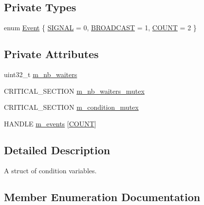 \subsection*{Private Types}
\begin{DoxyCompactItemize}
\item 
enum \hyperlink{structmage_1_1_condition_variable_ae7627253bf4faebc0aae84a77920d195}{Event} \{ \hyperlink{structmage_1_1_condition_variable_ae7627253bf4faebc0aae84a77920d195a83361ddf52d1973875f7a48ac4bccf94}{S\+I\+G\+N\+AL} = 0, 
\hyperlink{structmage_1_1_condition_variable_ae7627253bf4faebc0aae84a77920d195a5863233d3c1e62ca806753b0d175199f}{B\+R\+O\+A\+D\+C\+A\+ST} = 1, 
\hyperlink{structmage_1_1_condition_variable_ae7627253bf4faebc0aae84a77920d195a553680ab09f088489b7d9f3cef9a5e14}{C\+O\+U\+NT} = 2
 \}
\end{DoxyCompactItemize}
\subsection*{Private Attributes}
\begin{DoxyCompactItemize}
\item 
uint32\+\_\+t \hyperlink{structmage_1_1_condition_variable_ac02cb14000a597ec91b8546bdcbb9dd1}{m\+\_\+nb\+\_\+waiters}
\item 
C\+R\+I\+T\+I\+C\+A\+L\+\_\+\+S\+E\+C\+T\+I\+ON \hyperlink{structmage_1_1_condition_variable_a0686e682d62d44ff1eb9ac45acbb0eab}{m\+\_\+nb\+\_\+waiters\+\_\+mutex}
\item 
C\+R\+I\+T\+I\+C\+A\+L\+\_\+\+S\+E\+C\+T\+I\+ON \hyperlink{structmage_1_1_condition_variable_ab5ff870b2881a1979ccaec986d762441}{m\+\_\+condition\+\_\+mutex}
\item 
H\+A\+N\+D\+LE \hyperlink{structmage_1_1_condition_variable_a00691d5e29735da356f577bb5522017d}{m\+\_\+events} \mbox{[}\hyperlink{structmage_1_1_condition_variable_ae7627253bf4faebc0aae84a77920d195a553680ab09f088489b7d9f3cef9a5e14}{C\+O\+U\+NT}\mbox{]}
\end{DoxyCompactItemize}


\subsection{Detailed Description}
A struct of condition variables. 

\subsection{Member Enumeration Documentation}
\hypertarget{structmage_1_1_condition_variable_ae7627253bf4faebc0aae84a77920d195}{}\label{structmage_1_1_condition_variable_ae7627253bf4faebc0aae84a77920d195} 
